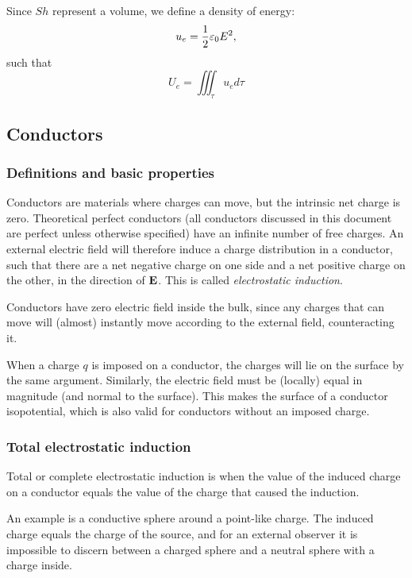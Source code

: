     Since $S h$ represent a volume, we define a density of energy: 
    \begin{equation}
        u_e = \frac{1}{2}\varepsilon_0 E^2, 
    \end{equation}
    such that 
    \begin{equation}
        U_e = \iiint_\tau u_e d\tau
    \end{equation}
    
\subsection{Conductors}
    \subsubsection{Definitions and basic properties}
        Conductors are materials where charges can move, but the intrinsic net charge is zero. 
        Theoretical perfect conductors (all conductors discussed in this document are perfect unless otherwise specified) 
        have an infinite number of free charges. 
        An external electric field will therefore induce a charge distribution in a conductor, 
        such that there are a net negative charge on one side and a net positive charge on the other, 
        in the direction of $\mathbf{E}$. This is called \textit{electrostatic induction}.
        
        Conductors have zero electric field inside the bulk, 
        since any charges that can move will (almost) instantly move according to the external field, counteracting it. 
        
        When a charge $q$ is imposed on a conductor, the charges will lie on the surface by the same argument. 
        Similarly, the electric field must be (locally) equal in magnitude (and normal to the surface). 
        This makes the surface of a conductor isopotential, which is also valid for conductors without an imposed charge. 

    \subsubsection{Total electrostatic induction}
        Total or complete electrostatic induction is when the value of the induced charge on a conductor 
        equals the value of the charge that caused the induction. 
        
        An example is a conductive sphere around a point-like charge. The induced charge equals the charge of the source, 
        and for an external observer it is impossible to discern between a charged sphere and a neutral sphere with a charge inside.


